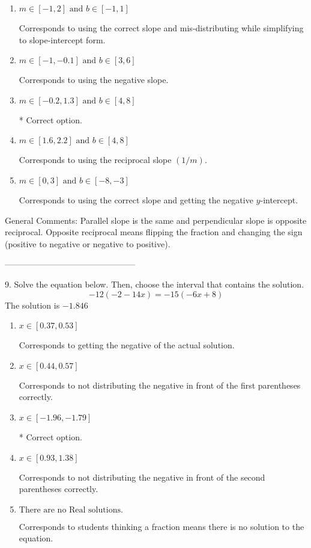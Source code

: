 \documentclass{article}[10pt]
\begin{document}
\begin{enumerate}[label=\Alph*.] 
\item $ m \in [-1, 2] \text{ and } b \in [-1, 1] $ 

  Corresponds to using the correct slope and mis-distributing while simplifying to slope-intercept form. 
\item $ m \in [-1, -0.1] \text{ and } b \in [3, 6] $ 

  Corresponds to using the negative slope. 
\item $ m \in [-0.2, 1.3] \text{ and } b \in [4, 8] $ 

 * Correct option. 
\item $ m \in [1.6, 2.2] \text{ and } b \in [4, 8] $ 

  Corresponds to using the reciprocal slope $(1/m)$. 
\item $ m \in [0, 3] \text{ and } b \in [-8, -3] $ 

  Corresponds to using the correct slope and getting the negative $y$-intercept. 
\end{enumerate} 
 
General Comments: Parallel slope is the same and perpendicular slope is opposite reciprocal. Opposite reciprocal means flipping the fraction and changing the sign (positive to negative or negative to positive).

-----------------------------------------------

9. Solve the equation below. Then, choose the interval that contains the solution.
$$ -12(-2-14 x) = -15(-6 x+8) $$ 
The solution is $ -1.846 $ 

\begin{enumerate}[label=\Alph*.] 
\item $ x \in [0.37, 0.53] $ 

  Corresponds to getting the negative of the actual solution. 
\item $ x \in [0.44, 0.57] $ 

  Corresponds to not distributing the negative in front of the first parentheses correctly. 
\item $ x \in [-1.96, -1.79] $ 

 * Correct option. 
\item $ x \in [0.93, 1.38] $ 

  Corresponds to not distributing the negative in front of the second parentheses correctly. 
\item $ \text{There are no Real solutions. } $ 

 Corresponds to students thinking a fraction means there is no solution to the equation. 
\end{enumerate} 
 
\end{document}

